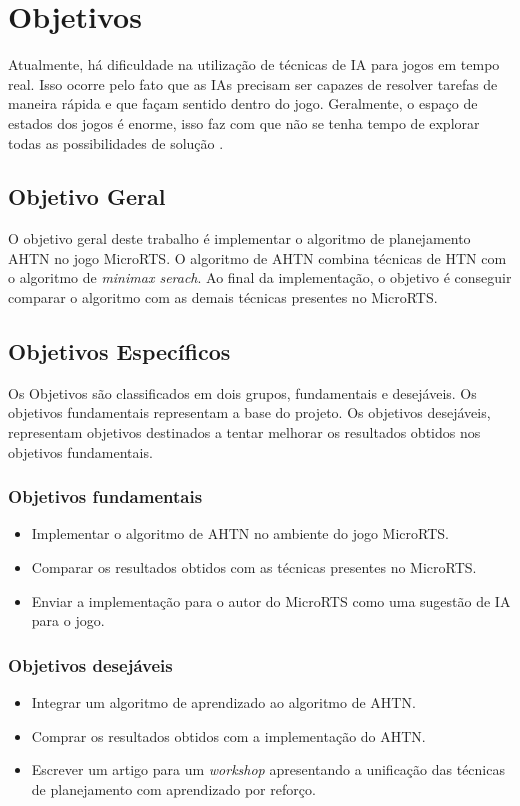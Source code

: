 
\chapter{\label{chap:ativ}Objetivos}

Atualmente, há dificuldade na utilização de técnicas de IA para jogos em tempo real.
Isso ocorre pelo fato que as IAs precisam ser capazes de resolver tarefas de maneira rápida e que façam sentido dentro do jogo.
Geralmente, o espaço de estados dos jogos é enorme, isso faz com que não se tenha tempo de explorar todas as possibilidades de solução \cite{millington2009artificial}.

\section{Objetivo Geral}
O objetivo geral deste trabalho é implementar o algoritmo de planejamento AHTN \cite{ontanon2015adversarial} no jogo MicroRTS. O algoritmo de AHTN combina técnicas de HTN com o algoritmo de \textit{minimax serach}. Ao final da implementação, o objetivo é conseguir comparar o algoritmo com as demais técnicas presentes no MicroRTS.

\section{Objetivos Específicos}\label{obj:esp}
Os Objetivos são classificados em dois grupos, fundamentais e desejáveis. 
Os objetivos fundamentais representam a base do projeto.
Os objetivos desejáveis, representam objetivos destinados a tentar melhorar os resultados obtidos nos objetivos fundamentais. 

\subsection{Objetivos fundamentais} \label{sec:objfunda}

\begin{itemize}
	\item Implementar o algoritmo de AHTN no ambiente do jogo MicroRTS.
	\item Comparar os resultados obtidos com as técnicas presentes no MicroRTS.
	\item Enviar a implementação para o autor do MicroRTS como uma sugestão de IA para o jogo.
\end{itemize}

\subsection{Objetivos desejáveis} \label{sec:objdesej}
\begin{itemize}
	\item Integrar um algoritmo de aprendizado ao algoritmo de AHTN.
	\item Comprar os resultados obtidos com a implementação do AHTN.
	\item Escrever um artigo para um \textit{workshop} apresentando a unificação das técnicas de planejamento com aprendizado por reforço.
\end{itemize}

